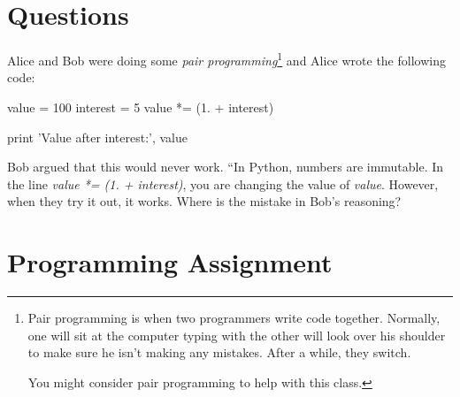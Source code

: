 

\section{Questions}

\question
Alice and Bob were doing some \textit{pair programming}\footnote{Pair programming is when two programmers write code together. Normally, one will sit at the computer typing with the other will look over his shoulder to make sure he isn't making any mistakes. After a while, they switch.

You might consider pair programming to help with this class.} and Alice wrote the following code:

\begin{python}
value = 100
interest = 5
value *= (1. + interest)

print 'Value after interest:', value
\end{python}

Bob argued that this would never work. ``In Python, numbers are immutable. In the line \textit{value *= (1. + interest)}, you are changing the value of \textit{value}. However, when they try it out, it works. Where is the mistake in Bob's reasoning?

\section{Programming Assignment}



